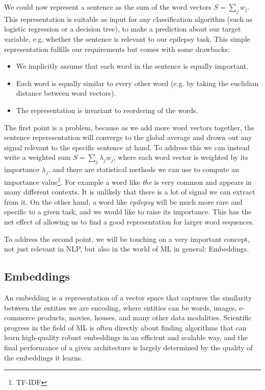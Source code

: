 We could now represent a sentence as the sum of the word vectors $S = \sum_j w_j$. This representation is suitable as input for any classification algorithm (such as logistic regression or a decision tree), to make a prediction about our target variable, e.g. whether the sentence is relevant to our epilepsy task.
This simple representation fulfills our requirements but comes with some drawbacks:
\begin{itemize}
    \item We implicitly assume that each word in the sentence is equally important.
    \item Each word is equally similar to every other word (e.g. by taking the euclidian distance between word vectors).
    \item The representation is invariant to reordering of the words.
\end{itemize}
The first point is a problem, because as we add more word vectors together, the sentence reperesentation will converge to the global average and drown out any signal relevant to the specific sentence at hand.
To address this we can instead write a weighted sum $S = \sum_j \lambda_j w_j$, where each word vector is weighted by its importance $\lambda_j$, and there are statistical methods we can use to compute an importance value\footnote{TF-IDF}.
For example a word like \textit{the} is very common and appears in many different contexts.
It is unlikely that there is a lot of signal we can extract from it.
On the other hand, a word like \textit{epilepsy} will be much more rare and specific to a given task, and we would like to raise its importance.
This has the net effect of allowing us to find a good representation for larger word sequences.

To address the second point, we will be touching on a very important concept, not just relevant in NLP, but also in the world of ML in general: Embeddings.

\subsection{Embeddings}
\label{embeddings}
An embedding is a representation of a vector space that captures the similarity between the entities we are encoding, where entities can be words, images, e-commerce products, movies, houses, and many other data modalities.
Scientific progress in the field of ML is often directly about finding algorithms that can learn high-quality robust embeddings in an efficient and scalable way, and the final performance of a given architecture is largely determined by the quality of the embeddings it learns.

